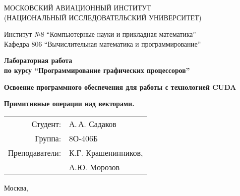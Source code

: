 \begin{titlepage}
\begin{center}

МОСКОВСКИЙ АВИАЦИОННЫЙ ИНСТИТУТ\\ (НАЦИОНАЛЬНЫЙ ИССЛЕДОВАТЕЛЬСКИЙ УНИВЕРСИТЕТ)

\vspace{18pt}

Институт №8 \enquote{Компьютерные науки и прикладная математика}\\
Кафедра 806 \enquote{Вычислительная математика и программирование}


\vspace{68pt}
\textbf{
Лабораторная работа \\ по курсу \enquote{Программирование графических процессоров}
}

\vspace{48pt}
\textbf{
Освоение программного обеспечения для работы с технологией CUDA
}

\vspace{28pt}
\textbf{
Примитивные операции над векторами.
}
\end{center}

\vspace{132pt}

\begin{flushright}
\begin{tabular}{rl}
Студент: & А.\,А. Садаков \\
Группа: & 8О-406Б \\
Преподаватели: & К.Г. Крашенинников,\\
 & А.Ю. Морозов\\
\end{tabular}
\end{flushright}

\vfill

\begin{center}
Москва, \the\year
\end{center}
\end{titlepage}

\pagebreak
